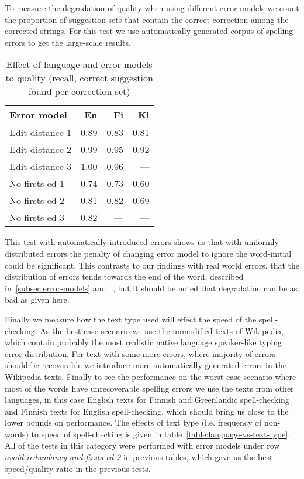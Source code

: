 \documentclass[free]{flammie}
\begin{document}
To measure the degradation of quality when using different error models we
count the proportion of suggestion sets that contain the correct correction
among the corrected strings. For this test we use automatically generated corpus
of spelling errors to get the large-scale results.

\begin{table}[h]
\begin{center}
\begin{scriptsize}
\begin{tabular}{|l|rrr|}
\hline
\bf Error model & \bf En & \bf Fi & \bf Kl\\ 
\hline
\hline
\hline
Edit distance 1 &
0.89&0.83&0.81
\\
Edit distance 2 &
0.99&0.95&0.92
\\
Edit distance 3 &
1.00&0.96&---
\\
No firsts ed 1 & 
0.74&0.73&0.60
\\
No firsts ed 2 &
0.81&0.82&0.69
\\
No firsts ed 3 &
0.82&---&---
\\
\hline
\end{tabular}
\end{scriptsize}
\end{center}
\caption{\label{table:error-model-vs-language} Effect of language and 
error models to quality (recall, correct suggestion found per
correction set)}
\end{table}

This test with automatically introduced errors shows us that with uniformly
distributed errors the penalty of changing error model to ignore the
word-initial could be significant. This contrasts to our findings with real
world errors, that the distribution of errors tends towards the end of the word,
described in~\ref{subsec:error-models} and ~\cite{Bhagat/2007},
but it should be noted that degradation can be as bad as given here.

Finally we measure how the text type used will effect the speed of the
spell-checking. As the best-case scenario we use the unmodified texts of
Wikipedia, which contain probably the most realistic native language
speaker-like typing error distribution. For text with some more errors, where
majority of errors should be recoverable we introduce more automatically
generated errors in the Wikipedia texts. Finally to see the performance on
the worst case scenario where most of the words have unrecoverable
spelling errors
we use the texts from other languages, in this case English texts for Finnish
and Greenlandic spell-checking and Finnish texts for English spell-checking,
which should bring us close to the lower bounds on performance. The
effects of text type (i.e. frequency of non-words) to speed of spell-checking
is given in table~\ref{table:language-vs-text-type}. All of
the tests in this category were performed with error models under row
\emph{avoid redundancy and firsts ed 2} in previous tables, which gave us the
best speed/quality ratio in the previous tests.
\end{document}
